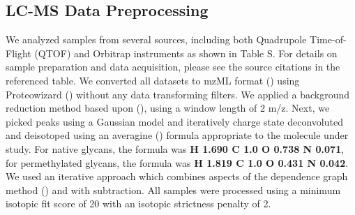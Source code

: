 \subsection{LC-MS Data Preprocessing}
    We analyzed samples from several sources, including both Quadrupole Time-of-Flight (QTOF) and
    Orbitrap instruments as shown in Table S. For details on sample preparation
    and data acquisition, please see the source citations in the referenced table. We converted all
    datasets to mzML format (\cite{Martens2011}) using Proteowizard (\cite{Kessner2008}) without
    any data transforming filters. We applied a background reduction method based upon (\cite{Kaur2006}),
    using a window length of 2 m/z. Next, we picked peaks using a Gaussian model and iteratively charge
    state deconvoluted and deisotoped using an averagine (\cite{Senko1995}) formula appropriate to the
    molecule under study. For native glycans, the formula was \textbf{H 1.690 C 1.0 O 0.738 N 0.071},
    for permethylated glycans, the formula was \textbf{H 1.819 C 1.0 O 0.431 N 0.042}. We used an iterative
    approach which combines aspects of the dependence graph method (\cite{Liu2010}) and with subtraction.
    All samples were processed using a minimum isotopic fit score of 20 with an isotopic strictness penalty
    of 2.

